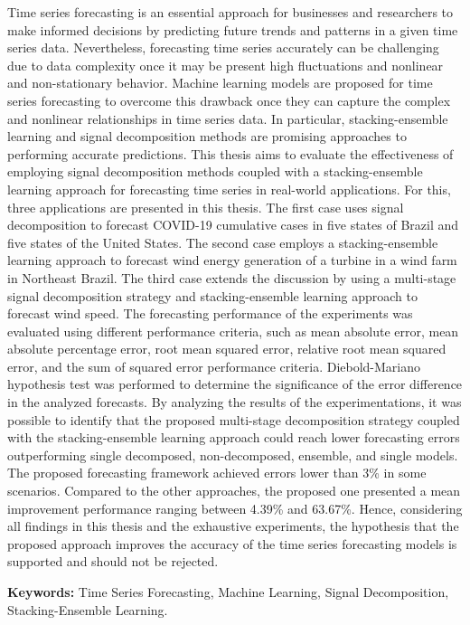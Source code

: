 \begin{resumo}[Abstract]
Time series forecasting is an essential approach for businesses and researchers to make informed decisions by predicting future trends and patterns in a given time series data.
Nevertheless, forecasting time series accurately can be challenging due to data complexity once it may be present high fluctuations and nonlinear and non-stationary behavior.
Machine learning models are proposed for time series forecasting to overcome this drawback once they can capture the complex and nonlinear relationships in time series data. In particular, stacking-ensemble learning and signal decomposition methods are promising approaches to performing accurate predictions.
This thesis aims to evaluate the effectiveness of employing signal decomposition methods coupled with a stacking-ensemble learning approach for forecasting time series in real-world applications.
For this, three applications are presented in this thesis. 
%
The first case uses signal decomposition to forecast COVID-19 cumulative cases in five states of Brazil and five states of the United States. The second case employs a stacking-ensemble learning approach to forecast wind energy generation of a turbine in a wind farm in Northeast Brazil. The third case extends the discussion by using a multi-stage signal decomposition strategy and stacking-ensemble learning approach to forecast wind speed.
The forecasting performance of the experiments was evaluated using different performance criteria, such as mean absolute error, mean absolute percentage error, root mean squared error, relative root mean squared error, and the sum of squared error performance criteria. Diebold-Mariano hypothesis test was performed to determine the significance of the error difference in the analyzed forecasts.
By analyzing the results of the experimentations, it was possible to identify that the proposed multi-stage decomposition strategy coupled with the stacking-ensemble learning approach could reach lower forecasting errors outperforming single decomposed, non-decomposed, ensemble, and single models. 
The proposed forecasting framework achieved errors lower than 3\% in some scenarios. Compared to the other approaches, the proposed one presented a mean improvement performance ranging between 4.39\% and 63.67\%.
Hence, considering all findings in this thesis and the exhaustive experiments, the hypothesis that the proposed approach improves the accuracy of the time series forecasting models is supported and should not be rejected.

\vspace{5mm}
\noindent \textbf{Keywords:} Time Series Forecasting, Machine Learning, Signal Decomposition, Stacking-Ensemble Learning. 
   
\end{resumo}


